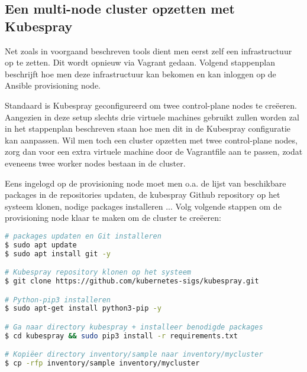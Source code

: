 \subsection{Een multi-node cluster opzetten met Kubespray}
\label{sec:kubespraysetup}
Net zoals in voorgaand beschreven tools dient men eerst zelf een infrastructuur op te zetten. Dit wordt opnieuw via Vagrant gedaan. Volgend stappenplan beschrijft hoe men deze infrastructuur kan bekomen en kan inloggen op de Ansible provisioning node. 

Standaard is Kubespray geconfigureerd om twee control-plane nodes te creëeren. Aangezien in deze setup slechts drie virtuele machines gebruikt zullen worden zal in het stappenplan beschreven staan hoe men dit in de Kubespray configuratie kan aanpassen. Wil men toch een cluster opzetten met twee control-plane nodes, zorg dan voor een extra virtuele machine door de Vagrantfile aan te passen, zodat eveneens twee worker nodes bestaan in de cluster. 


Eens ingelogd op de provisioning node moet men o.a. de lijst van beschikbare packages in de repositories updaten, de kubespray Github repository op het systeem klonen, nodige packages installeren ... Volg volgende stappen om de provisioning node klaar te maken om de cluster te creëeren:

\begin{lstlisting}[language=bash]
# packages updaten en Git installeren
$ sudo apt update
$ sudo apt install git -y

# Kubespray repository klonen op het systeem
$ git clone https://github.com/kubernetes-sigs/kubespray.git

# Python-pip3 installeren
$ sudo apt-get install python3-pip -y

# Ga naar directory kubespray + installeer benodigde packages
$ cd kubespray && sudo pip3 install -r requirements.txt

# Kopiëer directory inventory/sample naar inventory/mycluster
$ cp -rfp inventory/sample inventory/mycluster   
 
\end{lstlisting}
 
